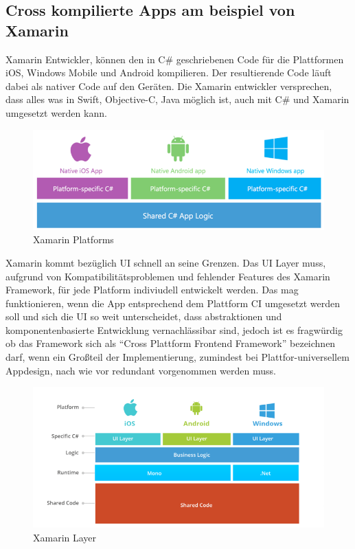 \subsection{Cross kompilierte Apps am beispiel von Xamarin}

Xamarin Entwickler, können den in C\# geschriebenen Code für die Plattformen iOS, Windows Mobile und Android kompilieren.
Der resultierende Code läuft dabei als nativer Code auf den Geräten.
Die Xamarin entwickler versprechen, dass alles was in Swift, Objective-C, Java möglich ist, auch mit C\# und Xamarin umgesetzt werden kann.\cite{projectxamarin}

\begin{figure}[ht]
 \centering
 \includegraphics[width=0.9\linewidth]{kapitel2/csharp_xamarin.png}
 \caption{Xamarin Platforms \cite{7Reas20:online}}
\end{figure}
\vspace{1cm}

Xamarin kommt bezüglich \ac{UI} schnell an seine Grenzen. Das \ac{UI} Layer muss, aufgrund von Kompatibilitätsproblemen und fehlender Features des Xamarin Framework,
für jede Platform indiviudell entwickelt werden. Das mag funktionieren, wenn die App entsprechend dem Plattform CI umgesetzt werden soll und sich die \ac{UI} so weit unterscheidet,
dass abstraktionen und komponentenbasierte Entwicklung vernachlässibar sind, jedoch ist es fragwürdig ob das Framework sich als ``Cross Plattform Frontend Framework'' bezeichnen darf,
wenn ein Großteil der Implementierung, zumindest bei Plattfor-universellem Appdesign, nach wie vor redundant vorgenommen werden muss.\cite{7Reas20:online}

\begin{figure}[ht]
 \centering
 \includegraphics[width=0.8\linewidth]{kapitel2/xamarin_ui_blocker.png}
 \caption{Xamarin Layer \cite{7Reas20:online}}
\end{figure}

